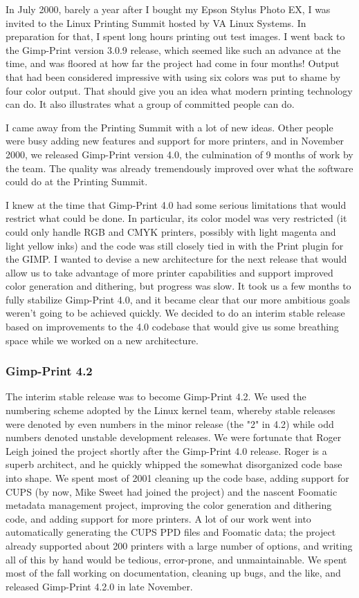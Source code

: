 \documentclass{article}[letter]
\begin{document}
In July 2000, barely a year after I bought my Epson Stylus Photo EX, I
was invited to the Linux Printing Summit hosted by VA Linux
Systems. In preparation for that, I spent long hours printing out test
images. I went back to the Gimp-Print version 3.0.9 release, which
seemed like such an advance at the time, and was floored at how far
the project had come in four months! Output that had been considered
impressive with using six colors was put to shame by four color
output. That should give you an idea what modern printing technology
can do. It also illustrates what a group of committed people can do.

I came away from the Printing Summit with a lot of new ideas. Other
people were busy adding new features and support for more printers, and
in November 2000, we released Gimp-Print version 4.0, the culmination of
9 months of work by the team. The quality was already tremendously
improved over what the software could do at the Printing Summit.

I knew at the time that Gimp-Print 4.0 had some serious limitations
that would restrict what could be done. In particular, its color model
was very restricted (it could only handle RGB and CMYK printers,
possibly with light magenta and light yellow inks) and the code was
still closely tied in with the Print plugin for the GIMP. I wanted to
devise a new architecture for the next release that would allow us to
take advantage of more printer capabilities and support improved color
generation and dithering, but progress was slow. It took us a few
months to fully stabilize Gimp-Print 4.0, and it became clear that our
more ambitious goals weren't going to be achieved quickly. We decided
to do an interim stable release based on improvements to the 4.0
codebase that would give us some breathing space while we worked on a
new architecture.

\subsubsection{Gimp-Print 4.2}

The interim stable release was to become Gimp-Print 4.2. We used the
numbering scheme adopted by the Linux kernel team, whereby stable
releases were denoted by even numbers in the minor release (the "2" in
4.2) while odd numbers denoted unstable development releases. We were
fortunate that Roger Leigh joined the project shortly after the
Gimp-Print 4.0 release. Roger is a superb architect, and he quickly
whipped the somewhat disorganized code base into shape. We spent most
of 2001 cleaning up the code base, adding support for CUPS (by now,
Mike Sweet had joined the project) and the nascent Foomatic metadata
management project, improving the color generation and dithering code,
and adding support for more printers. A lot of our work went into
automatically generating the CUPS PPD files and Foomatic data; the
project already supported about 200 printers with a large number of
options, and writing all of this by hand would be tedious,
error-prone, and unmaintainable. We spent most of the fall working on
documentation, cleaning up bugs, and the like, and released Gimp-Print
4.2.0 in late November.
\end{document}
